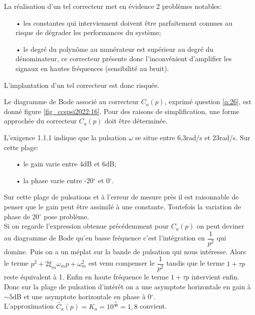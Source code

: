 \ifprof
\begin{corrige}
La réalisation d'un tel correcteur met en évidence 2 problèmes notables:
\begin{itemize}
\item[•] les constantes qui interviennent doivent être parfaitement connues au risque de dégrader les performances du système;
\item[•] le degré du polynôme au numérateur est supérieur au degré du dénominateur, ce correcteur présente donc l'inconvénient d'amplifier les signaux en hautes fréquences (sensibilité au bruit).
\end{itemize}

L'implantation d'un tel correcteur est donc risquée.
\end{corrige}
\else
\fi
Le diagramme de Bode associé au correcteur $C_{a}(p)$, exprimé question \ref{q:26}, est donné figure \ref{fig_ccspsi2022:16}. Pour des raisons de simplification, une forme approchée du correcteur $C_{a}(p)$ doit être déterminée.

\ifprof
\begin{corrige}
L'exigence 1.1.1 indique que la pulsation $\omega$ se situe entre 6,3rad/s et 23rad/s. Sur cette plage:
\begin{itemize}
\item[•] le gain varie entre 4dB et 6dB;
\item[•] la phase varie entre -20$^\circ$ et 0$^\circ$.
\end{itemize}

Sur cette plage de pulsations et à l'erreur de mesure près il est raisonnable de penser que le gain peut être assimilé à une constante. Toutefois la variation de phase de 20$^\circ$ pose problème. \\

Si on regarde l'expression obtenue précédemment pour $C_a(p)$ on peut deviner au diagramme de Bode qu'en basse fréquence c'est l'intégration en $\dfrac{1}{p^2}$ qui domine. Puis on a un méplat sur la bande de pulsation qui nous intéresse. Alors le terme $p^2 + 2\xi_m \omega_m p + \omega_m^2$ est venu compenser le $\dfrac{1}{p^2}$ tandis que le terme $1+\tau p$ reste équivalent à 1. Enfin en haute fréquence le terme $1+\tau p$ intervient enfin.\\

Donc sur la plage de pulsation d'intérêt on a une asymptote horizontale en gain à $\sim 5$dB et une asymptote horizontale en phase à 0$^\circ$.\\

L'approximation $\boxed{\widetilde{C_a}(p) = K_a = 10^{\frac{5}{20}} = 1,8}$ convient.
\end{corrige}
\else
\fi

